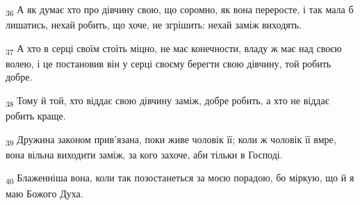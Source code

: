 \begin{tcolorbox}
\textsubscript{36} А як думає хто про дівчину свою, що соромно, як вона переросте, і так мала б лишатись, нехай робить, що хоче, не згрішить: нехай заміж виходять.
\end{tcolorbox}
\begin{tcolorbox}
\textsubscript{37} А хто в серці своїм стоїть міцно, не має конечности, владу ж має над своєю волею, і це постановив він у серці своєму берегти свою дівчину, той робить добре.
\end{tcolorbox}
\begin{tcolorbox}
\textsubscript{38} Тому й той, хто віддає свою дівчину заміж, добре робить, а хто не віддає робить краще.
\end{tcolorbox}
\begin{tcolorbox}
\textsubscript{39} Дружина законом прив'язана, поки живе чоловік її; коли ж чоловік її вмре, вона вільна виходити заміж, за кого захоче, аби тільки в Господі.
\end{tcolorbox}
\begin{tcolorbox}
\textsubscript{40} Блаженніша вона, коли так позостанеться за моєю порадою, бо міркую, що й я маю Божого Духа.
\end{tcolorbox}
